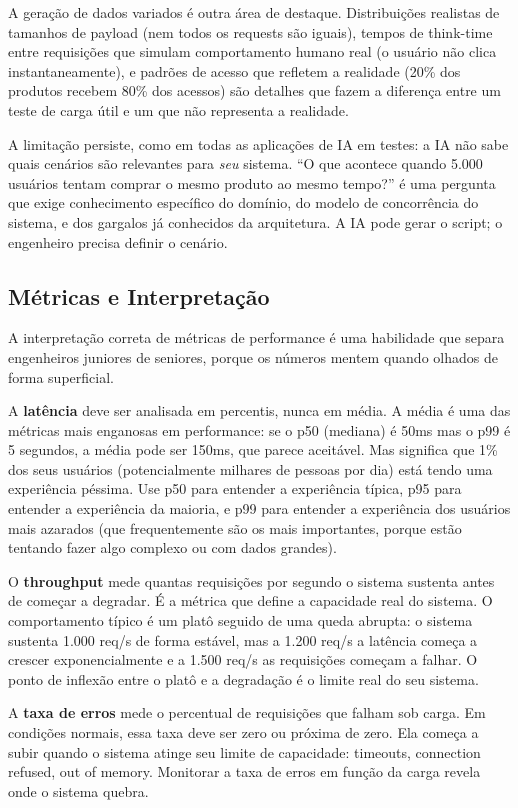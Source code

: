 A geração de dados variados é outra área de destaque. Distribuições realistas
de tamanhos de payload (nem todos os requests são iguais), tempos de think-time
entre requisições que simulam comportamento humano real (o usuário não clica
instantaneamente), e padrões de acesso que refletem a realidade (20\% dos
produtos recebem 80\% dos acessos) são detalhes que fazem a diferença entre um
teste de carga útil e um que não representa a realidade.

A limitação persiste, como em todas as aplicações de IA em testes: a IA não
sabe quais cenários são relevantes para \textit{seu} sistema. ``O que acontece
quando 5.000 usuários tentam comprar o mesmo produto ao mesmo tempo?'' é uma
pergunta que exige conhecimento específico do domínio, do modelo de concorrência
do sistema, e dos gargalos já conhecidos da arquitetura. A IA pode gerar o
script; o engenheiro precisa definir o cenário.

\subsection{Métricas e Interpretação}

A interpretação correta de métricas de performance é uma habilidade que separa
engenheiros juniores de seniores, porque os números mentem quando olhados de
forma superficial.

A \textbf{latência} deve ser analisada em percentis, nunca em média. A média
é uma das métricas mais enganosas em performance: se o p50 (mediana) é 50ms mas
o p99 é 5 segundos, a média pode ser 150ms, que parece aceitável. Mas significa
que 1\% dos seus usuários (potencialmente milhares de pessoas por dia) está
tendo uma experiência péssima. Use p50 para entender a experiência típica, p95
para entender a experiência da maioria, e p99 para entender a experiência dos
usuários mais azarados (que frequentemente são os mais importantes, porque estão
tentando fazer algo complexo ou com dados grandes).

O \textbf{throughput} mede quantas requisições por segundo o sistema sustenta
antes de começar a degradar. É a métrica que define a capacidade real do sistema.
O comportamento típico é um platô seguido de uma queda abrupta: o sistema
sustenta 1.000 req/s de forma estável, mas a 1.200 req/s a latência começa a
crescer exponencialmente e a 1.500 req/s as requisições começam a falhar. O
ponto de inflexão entre o platô e a degradação é o limite real do seu sistema.

A \textbf{taxa de erros} mede o percentual de requisições que falham sob carga.
Em condições normais, essa taxa deve ser zero ou próxima de zero. Ela começa a
subir quando o sistema atinge seu limite de capacidade: timeouts,
connection refused, out of memory. Monitorar a taxa de erros em função da carga
revela onde o sistema quebra.

